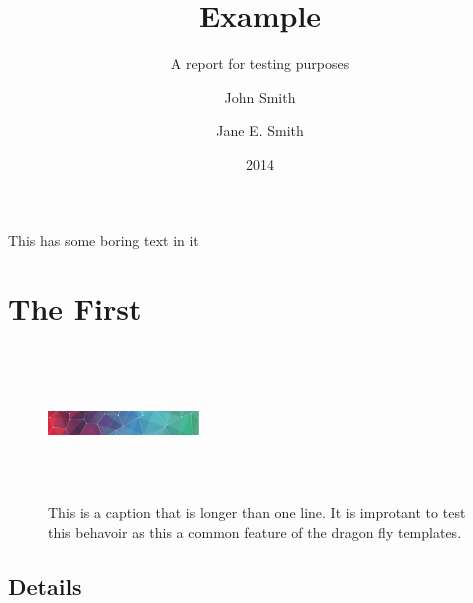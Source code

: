 \documentclass{mpi-far}
\title{Example}{An Example\\ Report about \emph{sheep} but that also has such
a long title that it actually has to wrap!}
\subtitle{A report for testing purposes}
\date{2014}
\author{John Smith \and Jane E. Smith}
\begin{document}
\maketitle

\tableofcontents


\summary

\citeself

This has some boring text in it



\section{The First}

\lipsum[1]


\begin{figure}[h]
  \includegraphics[width=40mm,height=40mm]{pattern}
  \caption{This is a caption that is longer than one line. It is improtant to test 
  this behavoir as this a common feature of the dragon fly templates.}
\end{figure}

\subsection{Details}

\lipsum[2]
\end{document}
